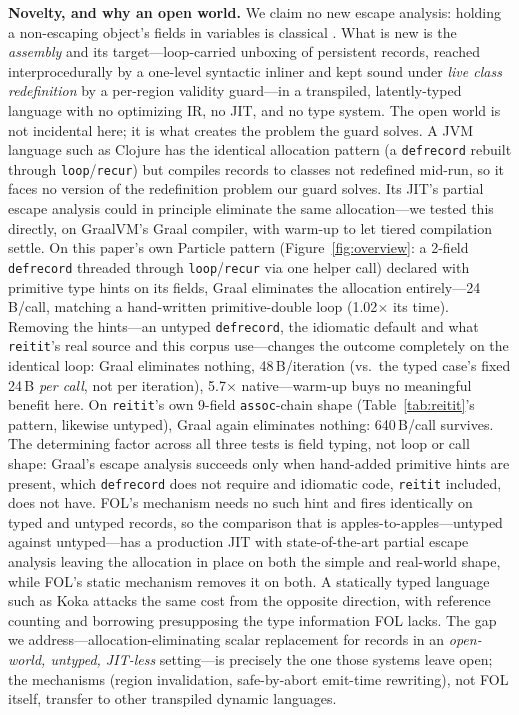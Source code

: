 \documentclass[sigplan,screen,review,anonymous]{acmart}
\begin{document}
\textbf{Novelty, and why an open world.} We claim no new escape analysis:
holding a non-escaping object's fields in variables is classical
\cite{choi1999escape,stadler2014partial}. What is new is the \emph{assembly} and
its target---loop-carried unboxing of persistent records, reached
interprocedurally by a one-level syntactic inliner and kept sound under
\emph{live class redefinition} by a per-region validity guard---in a transpiled,
latently-typed language with no optimizing IR, no JIT, and no type system.
The open world is not incidental here; it is what creates the problem the
guard solves. A JVM language such as Clojure has the identical allocation pattern
(a \texttt{defrecord} rebuilt through \texttt{loop}/\texttt{recur}) but compiles
records to classes not redefined mid-run, so it faces no version of
the redefinition problem our guard solves. Its JIT's partial escape analysis
\cite{stadler2014partial} could in principle eliminate the same
allocation---we tested this directly, on GraalVM's Graal compiler, with
warm-up to let tiered compilation settle. On this paper's own Particle pattern
(Figure~\ref{fig:overview}: a 2-field \texttt{defrecord} threaded through
\texttt{loop}/\texttt{recur} via one helper call) declared with primitive
type hints on its fields, Graal eliminates the allocation entirely---24\,B/call,
matching a hand-written primitive-double loop
(1.02$\times$ its time). Removing the hints---an untyped
\texttt{defrecord}, the idiomatic default and what \texttt{reitit}'s real
source and this corpus use---changes the outcome completely on
the identical loop: Graal eliminates nothing, 48\,B/iteration (vs.\ the
typed case's fixed 24\,B \emph{per call}, not per iteration), 5.7$\times$
native---warm-up buys no meaningful benefit here. On \texttt{reitit}'s own
9-field \texttt{assoc}-chain shape (Table~\ref{tab:reitit}'s pattern,
likewise untyped), Graal again eliminates nothing: 640\,B/call survives.
The determining factor across all three tests is field typing, not loop
or call shape: Graal's escape analysis succeeds only when hand-added
primitive hints are present, which \texttt{defrecord} does not
require and idiomatic code, \texttt{reitit} included, does not have. FOL's
mechanism needs no such hint and fires identically on typed and untyped
records, so the comparison that is apples-to-apples---untyped
against untyped---has a production JIT with state-of-the-art partial
escape analysis leaving the allocation in place on both the simple and
real-world shape, while FOL's static mechanism removes it on both.
A statically typed
language such as Koka attacks the same cost from the opposite
direction, with reference counting and borrowing
\cite{reinking2021perceus,lorenzen2023functional} presupposing the type
information FOL lacks. The gap we address---allocation-eliminating scalar
replacement for records in an \emph{open-world, untyped, JIT-less}
setting---is precisely the one those systems leave open; the mechanisms
(region invalidation, safe-by-abort emit-time rewriting), not FOL itself,
transfer to other transpiled dynamic languages.
\end{document}
